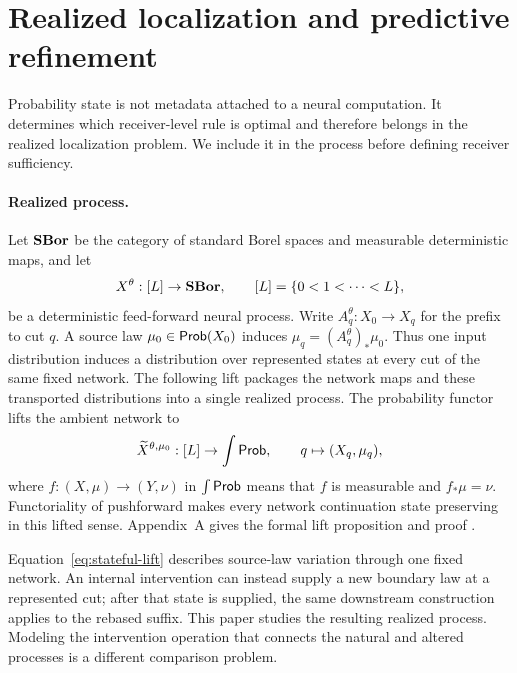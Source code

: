 \section{Realized localization and predictive refinement}
\label{sec:realized-access-presentations}
\label{sec:stateful-processes}
\label{sec:mechanism-presentations}

Probability state is not metadata attached to a neural computation. It determines which receiver-level rule is optimal and therefore belongs in the realized localization problem. We include it in the process before defining receiver sufficiency.

\paragraph{Realized process.}
Let $\mathbf{SBor}$ be the category of standard Borel spaces and measurable deterministic maps, and let
\[
X^\theta:[L]\to\mathbf{SBor},\qquad [L]=\{0<1<\cdots<L\},
\]
be a deterministic feed-forward neural process. Write $A_q^\theta:X_0\to X_q$ for the prefix to cut $q$. A source law $\mu_0\in\mathsf{Prob}(X_0)$ induces $\mu_q=(A_q^\theta)_*\mu_0$. Thus one input distribution induces a distribution over represented states at every cut of the same fixed network. The following lift packages the network maps and these transported distributions into a single realized process. The probability functor lifts the ambient network to
\begin{equation}
\widetilde X^{\theta,\mu_0}:[L]\to\int\mathsf{Prob},\qquad
q\mapsto(X_q,\mu_q),
\label{eq:stateful-lift}
\end{equation}
where $f:(X,\mu)\to(Y,\nu)$ in $\int\mathsf{Prob}$ means that $f$ is measurable and $f_*\mu=\nu$. Functoriality of pushforward makes every network continuation state preserving in this lifted sense. Appendix~A gives the formal lift proposition and proof \citep{fritz2020synthetic}.

Equation~\eqref{eq:stateful-lift} describes source-law variation through one fixed network. An internal intervention can instead supply a new boundary law at a represented cut; after that state is supplied, the same downstream construction applies to the rebased suffix. This paper studies the resulting realized process. Modeling the intervention operation that connects the natural and altered processes is a different comparison problem.

